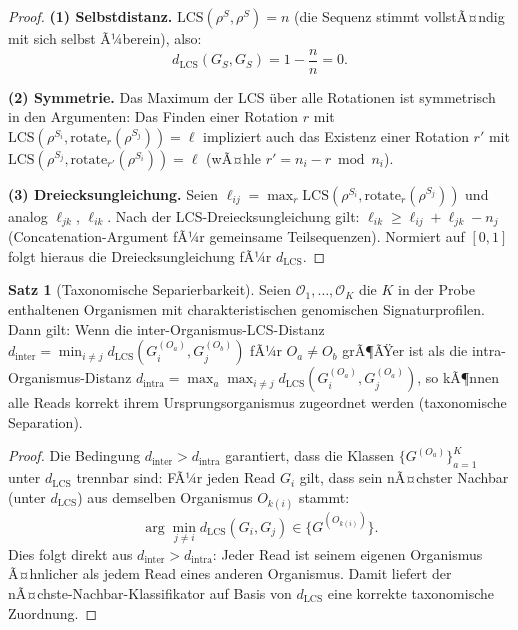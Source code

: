﻿\documentclass[a4paper,12pt]{article}
\theoremstyle{definition}
\newtheorem{satz}{Satz}
\begin{document}
\begin{proof}
	\textbf{(1) Selbstdistanz.}
	$\mathrm{LCS}(\rho^S, \rho^S) = n$ (die Sequenz stimmt vollstÃ¤ndig
	mit sich selbst Ã¼berein), also:
	\[
	d_{\mathrm{LCS}}(G_S, G_S) = 1 - \frac{n}{n} = 0.
	\]
	
	\textbf{(2) Symmetrie.}
	Das Maximum der LCS \"{u}ber alle Rotationen ist symmetrisch in den
	Argumenten: Das Finden einer Rotation $r$ mit
	$\mathrm{LCS}(\rho^{S_i}, \mathrm{rotate}_r(\rho^{S_j})) = \ell$
	impliziert auch das Existenz einer Rotation $r'$ mit
	$\mathrm{LCS}(\rho^{S_j}, \mathrm{rotate}_{r'}(\rho^{S_i})) = \ell$
	(wÃ¤hle $r' = n_i - r \bmod n_i$).
	
	\textbf{(3) Dreiecksungleichung.}
	Seien $\ell_{ij} = \max_r \mathrm{LCS}(\rho^{S_i}, \mathrm{rotate}_r(\rho^{S_j}))$
	und analog $\ell_{jk}$, $\ell_{ik}$.
	Nach der LCS-Dreiecksungleichung gilt:
	$\ell_{ik} \geq \ell_{ij} + \ell_{jk} - n_j$
	(Concatenation-Argument fÃ¼r gemeinsame Teilsequenzen).
	Normiert auf $[0,1]$ folgt hieraus die Dreiecksungleichung fÃ¼r
	$d_{\mathrm{LCS}}$. 
\end{proof}

\begin{satz}[Taxonomische Separierbarkeit]
	\label{satz:taxonomie}
	Seien $\mathcal{O}_1, \ldots, \mathcal{O}_K$ die $K$ in der Probe enthaltenen
	Organismen mit charakteristischen genomischen Signaturprofilen. Dann gilt:
	Wenn die inter-Organismus-LCS-Distanz
	$d_{\mathrm{inter}} = \min_{i \neq j} d_{\mathrm{LCS}}(G_i^{(O_a)}, G_j^{(O_b)})$
	fÃ¼r $O_a \neq O_b$ grÃ¶ÃŸer ist als die intra-Organismus-Distanz
	$d_{\mathrm{intra}} = \max_{a} \max_{i \neq j} d_{\mathrm{LCS}}(G_i^{(O_a)}, G_j^{(O_a)})$,
	so kÃ¶nnen alle Reads korrekt ihrem Ursprungsorganismus zugeordnet werden
	(taxonomische Separation).
\end{satz}

\begin{proof}
	Die Bedingung $d_{\mathrm{inter}} > d_{\mathrm{intra}}$ garantiert,
	dass die Klassen $\{G^{(O_a)}\}_{a=1}^K$ unter $d_{\mathrm{LCS}}$ trennbar sind:
	FÃ¼r jeden Read $G_i$ gilt, dass sein nÃ¤chster Nachbar (unter $d_{\mathrm{LCS}}$)
	aus demselben Organismus $O_{k(i)}$ stammt:
	\[
	\arg\min_{j \neq i} d_{\mathrm{LCS}}(G_i, G_j) \in
	\{G^{(O_{k(i)})}\}.
	\]
	Dies folgt direkt aus $d_{\mathrm{inter}} > d_{\mathrm{intra}}$:
	Jeder Read ist seinem eigenen Organismus Ã¤hnlicher als jedem Read
	eines anderen Organismus. Damit liefert der nÃ¤chste-Nachbar-Klassifikator
	auf Basis von $d_{\mathrm{LCS}}$ eine korrekte taxonomische Zuordnung. 
\end{proof}
\end{document}
